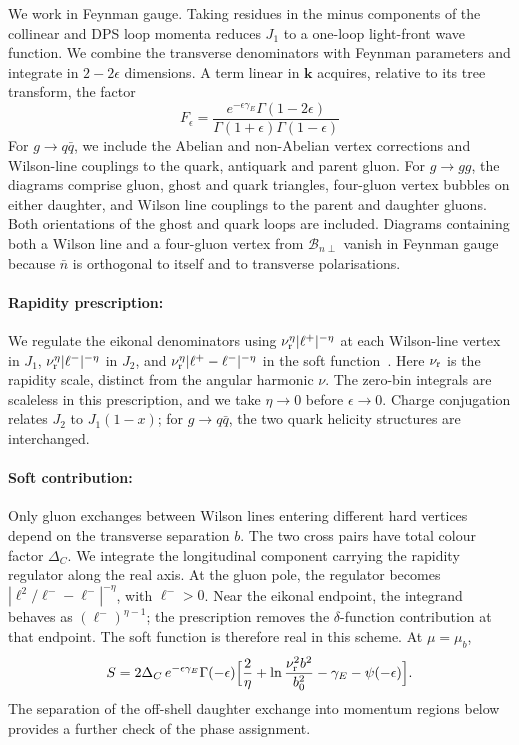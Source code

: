 \documentclass[%
 onecolumn,
 superscriptaddress,
 preprintnumbers,
 nofootinbib,
 amsmath,amssymb,
 aps,
 prl,
]{revtex4-2}
\newcommand{\kk}{\boldsymbol k}
\newcommand{\DD}{\Delta_C}
\begin{document}
We work in Feynman gauge. Taking residues in the minus components
of the collinear and DPS loop momenta reduces $J_1$ to a one-loop
light-front wave function. We combine the transverse denominators
with Feynman parameters and integrate in $2-2\epsilon$ dimensions.
A term linear in $\kk$ acquires, relative to its tree transform,
the factor
\begin{equation}
F_\epsilon=\frac{e^{-\epsilon\gamma_E}\Gamma(1-2\epsilon)}{\Gamma(1+\epsilon)\Gamma(1-\epsilon)}
\label{eq:Feps}
\end{equation}
For $g\to q\bar q$, we include the Abelian and non-Abelian vertex
corrections and Wilson-line couplings to the quark, antiquark and
parent gluon. For $g\to gg$, the diagrams comprise gluon, ghost
and quark triangles, four-gluon vertex bubbles on either daughter,
and Wilson line couplings to the parent and daughter gluons.
Both orientations of the ghost and quark loops are included.
Diagrams containing both a Wilson line and a four-gluon vertex
from $\mathcal B_{n\perp}$ vanish in Feynman gauge because
$\bar n$ is orthogonal to itself and to transverse polarisations.

\paragraph{Rapidity prescription: }
We regulate the eikonal denominators using
$\nu_{\rm r}^\eta|\ell^+|^{-\eta}$ at each Wilson-line vertex
in $J_1$, $\nu_{\rm r}^\eta|\ell^-|^{-\eta}$ in $J_2$, and
$\nu_{\rm r}^\eta|\ell^+-\ell^-|^{-\eta}$ in the soft function~\cite{Chiu:2012ir}. Here $\nu_{\rm r}$ is the rapidity scale,
distinct from the angular harmonic $\nu$. The zero-bin integrals
are scaleless in this prescription, and we take $\eta\to0$ before
$\epsilon\to0$. Charge conjugation relates $J_2$ to $J_1(1-x)$;
for $g\to q\bar q$, the two quark helicity structures are interchanged.

\paragraph{Soft contribution: }
Only gluon exchanges between Wilson lines entering different
hard vertices depend on the transverse separation $b$. The two
cross pairs have total colour factor $\DD$. We integrate the
longitudinal component carrying the rapidity regulator along the
real axis. At the gluon pole, the regulator becomes
$|\boldsymbol\ell^2/\ell^--\ell^-|^{-\eta}$, with $\ell^->0$.
Near the eikonal endpoint, the integrand behaves as
$(\ell^-)^{\eta-1}$; the prescription removes the
$\delta$-function contribution at that endpoint. The soft
function is therefore real in this scheme. At $\mu=\mu_b$,
\begin{equation}
S=2\DD\,e^{-\epsilon\gamma_E}\Gamma(-\epsilon)\Big[\frac2\eta+\ln\frac{\nu_{\rm r}^2b^2}{b_0^2}-\gamma_E-\psi(-\epsilon)\Big].
\label{eq:softeta}
\end{equation}
The separation of the off-shell daughter exchange into momentum
regions below provides a further check of the phase assignment.
\end{document}
